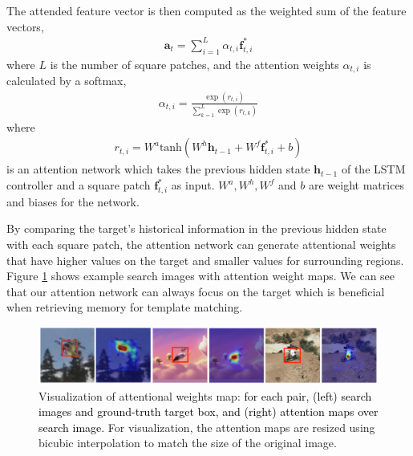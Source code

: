 \documentclass[runningheads]{llncs}
\newcommand{\yty}[1]{\textcolor{black}{#1}}
\newcommand{\abc}[1]{\textcolor{black}{#1}}
\newcommand{\abcn}[1]{\textcolor{black}{#1}}
\begin{document}
The attended feature vector is then computed as the weighted sum of the feature vectors,
\begin{align}
\mathbf{a}_t = \sum_{i=1}^{L}\alpha_{t,i}\mathbf{f}^*_{t,i}
\end{align}
where $L$ is the number of square patches, and the attention weights $\alpha_{t,i}$ is calculated by a softmax, 
\begin{align}
\alpha_{t,i} = \frac{\exp(r_{t,i})}{\sum_{k=1}^{L}\exp(r_{t,k})}
\end{align}
where 
\begin{align}
r_{t,i} = W^a \text{tanh}(W^h \mathbf{h}_{t-1}+W^f \mathbf{f}^*_{t,i}+b)
\end{align}
is an attention network which takes the previous hidden state $\mathbf{h}_{t-1}$ of the LSTM controller and a square patch $\mathbf{f}^*_{t,i}$ as input. $W^a, W^h, W^f$ and $b$ are weight matrices and biases for the network.

By comparing the target's historical information in the previous hidden state with each square patch, the attention network can generate attentional weights that have higher values on the target and smaller values for surrounding regions.  Figure \ref{fig:3} shows example search images with attention weight maps. We can see that our attention network can always focus on the target which is beneficial when retrieving memory for template matching. 

\begin{figure}[t]
	\begin{center}
		\includegraphics[width=0.9\linewidth]{figs/attention_row.jpg}
	\end{center}
	\caption{Visualization of attentional weights map: \abcn{for each pair, (left) search images and ground-truth target box, and (right) attention maps over search image.}
		For visualization, the attention maps are resized using bicubic interpolation to match the size of the original image.}
	\label{fig:3}
\end{figure}
\end{document}
